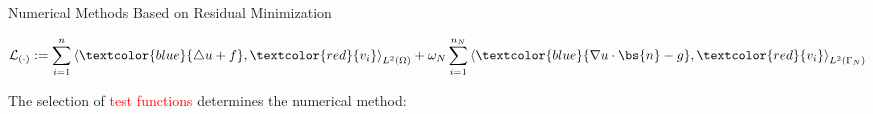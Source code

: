 \begin{frame} {Numerical Methods Based on Residual Minimization}

%
%

\begin{equation*}
\mathcal{L}_{(\cdot)} := \sum_{i=1}^{n} \left\langle   \textcolor{blue}{\bigtriangleup u + f}, \textcolor{red}{v_i}   \right\rangle_{L^2(\Omega)} +
\omega_N \sum_{i=1}^{n_N} \left\langle  \textcolor{blue}{ \nabla u \cdot \bs{n} -g} , \textcolor{red}{ v_i}\right\rangle_{L^2(\Gamma_N)}
\end{equation*}

The selection of \textcolor{red}{test functions} determines the numerical method:


\end{frame}
